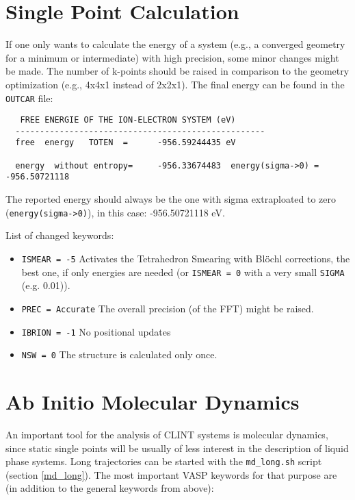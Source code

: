 \documentclass[a4paper,11pt]{article}
\begin{document}
\section{Single Point Calculation}

If one only wants to calculate the energy of a system (e.g., a converged geometry for a minimum or 
intermediate) with high precision, some minor changes might be made.
The number of k-points should be raised in comparison to the geometry optimization (e.g., 4x4x1 instead of 2x2x1).
The final energy can be found in the \texttt{OUTCAR} file:

\begin{verbatim}
   FREE ENERGIE OF THE ION-ELECTRON SYSTEM (eV)
  ---------------------------------------------------
  free  energy   TOTEN  =      -956.59244435 eV

  energy  without entropy=     -956.33674483  energy(sigma->0) =     -956.50721118
\end{verbatim}

The reported energy should always be the one with sigma extraploated to zero
(\texttt{energy(sigma->0)}), in this case:  -956.50721118 eV.

List of changed keywords:

\begin{itemize}
\item \texttt{ISMEAR = -5}  Activates the Tetrahedron Smearing with Blöchl corrections, the best one, if only energies are needed (or \texttt{ISMEAR = 0} with a very small \texttt{SIGMA} (e.g. 0.01)).
\item \texttt{PREC = Accurate} The overall precision (of the FFT) might be raised.
\item \texttt{IBRION = -1}  No positional updates
\item \texttt{NSW = 0}   The structure is calculated only once.
\end{itemize}

\section{Ab Initio Molecular Dynamics}

An important tool for the analysis of CLINT systems is molecular dynamics, since static
single points will be usually of less interest in the description of liquid phase 
systems.
Long trajectories can be started with the \texttt{md\_long.sh} script (section \ref{md_long}).
The most important VASP keywords for that purpose are (in addition to the general
keywords from above):
\end{document}
